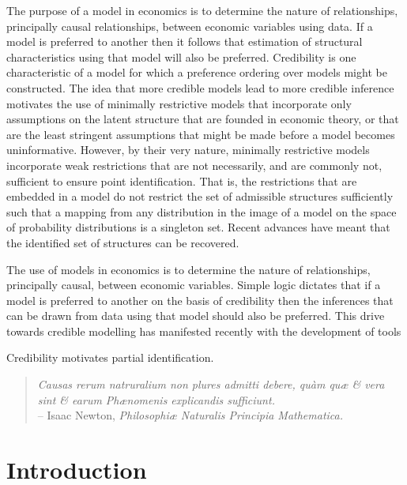 \documentclass[10pt,a4paper,twoside]{article}
\newcommand{\details}{C:/Dropbox/TeXTemplates/}
\numberwithin{equation}{subsection}
\begin{document}
The purpose of a model in economics is to determine the nature of relationships, principally causal relationships, between economic variables using data. If a model is preferred to another then it follows that estimation of structural characteristics using that model will also be preferred. Credibility is one characteristic of a model for which a preference ordering over models might be constructed. The idea that more credible models lead to more credible inference motivates the use of minimally restrictive models that incorporate only assumptions on the latent structure that are founded in economic theory, or that are the least stringent assumptions that might be made before a model becomes uninformative. However, by their very nature, minimally restrictive models incorporate weak restrictions that are not necessarily, and are commonly not, sufficient to ensure point identification. That is, the restrictions that are embedded in a model do not restrict the set of admissible structures sufficiently such that a mapping from any distribution in the image of a model on the space of probability distributions is a singleton set. Recent advances have meant that the identified set of structures can be recovered.  

The use of models in economics is to determine the nature of relationships, principally causal, between economic variables. Simple logic dictates that if a model is preferred to another on the basis of credibility then the inferences that can be drawn from data using that model should also be preferred. This drive towards credible modelling has manifested recently with the development of tools 

Credibility motivates partial identification. 
\begin{quote}
\textit{Causas rerum natruralium non plures admitti debere, qu{\`{a}}m qu{\ae} \& vera sint \& earum Ph{\ae}nomenis explicandis sufficiunt.}\\ 
\vspace{10pt}
\--- Isaac Newton, \textit{Philosophi{\ae} Naturalis Principia Mathematica.}
\end{quote}

\section{Introduction}



\end{document}

